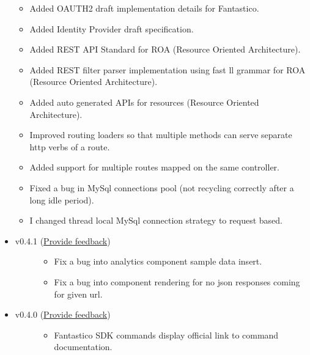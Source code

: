 \documentclass[letterpaper,10pt,english]{sphinxmanual}
\begin{document}
\begin{itemize}
\begin{itemize}
\item {} 
Added OAUTH2 draft implementation details for Fantastico.

\item {} 
Added Identity Provider draft specification.

\item {} 
Added REST API Standard for ROA (Resource Oriented Architecture).

\item {} 
Added REST filter parser implementation using fast ll grammar for ROA (Resource Oriented Architecture).

\item {} 
Added auto generated APIs for resources (Resource Oriented Architecture).

\item {} 
Improved routing loaders so that multiple methods can serve separate http verbs of a route.

\item {} 
Added support for multiple routes mapped on the same controller.

\item {} 
Fixed a bug in MySql connections pool (not recycling correctly after a long idle period).

\item {} 
I changed thread local MySql connection strategy to request based.

\end{itemize}

\item {} \begin{description}
\item[{v0.4.1 (\href{https://docs.google.com/forms/d/1tKBopU3lfDB\_w8F4h7Rl1Rn4uydAJq-nha09L\_ptJck/edit?usp=sharing}{Provide feedback})}] \leavevmode\begin{itemize}
\item {} 
Fix a bug into analytics component sample data insert.

\item {} 
Fix a bug into component rendering for no json responses coming for given url.

\end{itemize}

\end{description}

\item {} \begin{description}
\item[{v0.4.0 (\href{https://docs.google.com/forms/d/1tKBopU3lfDB\_w8F4h7Rl1Rn4uydAJq-nha09L\_ptJck/edit?usp=sharing}{Provide feedback})}] \leavevmode\begin{itemize}
\item {} 
Fantastico SDK commands display official link to command documentation.


\end{itemize}
\end{description}
\end{itemize}
\end{document}
